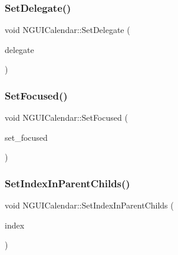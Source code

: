\hypertarget{class_n_g_u_i_calendar_a1e13ebafd05cc39c40d7e1186992c74b}{}\label{class_n_g_u_i_calendar_a1e13ebafd05cc39c40d7e1186992c74b} 
\subsubsection{\texorpdfstring{Set\+Delegate()}{SetDelegate()}}
{\footnotesize\ttfamily void N\+G\+U\+I\+Calendar\+::\+Set\+Delegate (\begin{DoxyParamCaption}\item[{N\+G\+U\+I\+Calendar\+Delegate@}]{delegate }\end{DoxyParamCaption})}

\hypertarget{class_n_g_u_i_calendar_ae0683ef0b7866445dce9f6530cb71667}{}\label{class_n_g_u_i_calendar_ae0683ef0b7866445dce9f6530cb71667} 
\subsubsection{\texorpdfstring{Set\+Focused()}{SetFocused()}}
{\footnotesize\ttfamily void N\+G\+U\+I\+Calendar\+::\+Set\+Focused (\begin{DoxyParamCaption}\item[{bool}]{set\+\_\+focused }\end{DoxyParamCaption})}

\hypertarget{class_n_g_u_i_calendar_a76dcad18fb7454a9dfae73d0c913af3e}{}\label{class_n_g_u_i_calendar_a76dcad18fb7454a9dfae73d0c913af3e} 
\subsubsection{\texorpdfstring{Set\+Index\+In\+Parent\+Childs()}{SetIndexInParentChilds()}}
{\footnotesize\ttfamily void N\+G\+U\+I\+Calendar\+::\+Set\+Index\+In\+Parent\+Childs (\begin{DoxyParamCaption}\item[{int}]{index }\end{DoxyParamCaption})}

